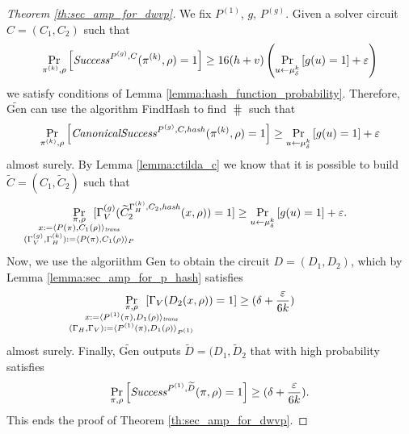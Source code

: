 \begin{proof}[Theorem \ref{th:sec_amp_for_dwvp}]
%
We fix $P^{(1)}$, $g$, $P^{(g)}$. Given a solver circuit $C = (C_1, C_2)$ such that
\begin{align*}
    \underset{\pi^{(k)}, \rho}{\Pr}\left[\operatorname{\mathit{Success}}^{P^{(g)}, C}(\pi^{(k)}, \rho) = 1\right] \geq 16(h+v)\left(\underset{u \leftarrow \mu_\delta^k}{\Pr}\left[g(u) = 1\right] + \varepsilon\right)
\end{align*}
we satisfy conditions of Lemma \ref{lemma:hash_function_probability}. Therefore, $\widetilde{\text{Gen}}$ can use the algorithm FindHash to find $\hash$ such that
\begin{align*}
    \underset{\pi^{(k)}, \rho}{\Pr}\left[\operatorname{\mathit{CanonicalSuccess}}^{P^{(g)}, C, \operatorname{\mathit{hash}}}(\pi^{(k)}, \rho) = 1\right] \geq \underset{u \leftarrow \mu_\delta^k}{\Pr}\left[g(u) = 1\right] + \varepsilon
\end{align*}
almost surely.
By Lemma \ref{lemma:ctilda_c} we know that it is possible to build $\widetilde{C} = (C_1, \widetilde{C}_2)$ such that
\begin{align*}
    \underset{
      \mathclap {
      \substack{\pi, \rho \\
        x := \langle P(\pi), C_1(\rho) \rangle_{\mathit{trans}} \\
        (\Gamma_V^{(g)}, \Gamma_H^{(k)}) := \langle P(\pi), C_1(\rho) \rangle_{P}
      }}}
    {\Pr}\mkern13mu[\Gamma_V^{(g)}(\widetilde{C}_2^{\Gamma_H^{(k)}, C_2, \hash}(x, \rho)) = 1]
    \geq
\underset{u \leftarrow \mu_\delta^k}{\Pr}\left[g(u) = 1\right] + \varepsilon.
\end{align*}
Now, we use the algoriithm Gen to obtain the circuit $D = (D_1, D_2)$, which by Lemma \ref{lemma:sec_amp_for_p_hash} satisfies
\begin{align}
  \label{eq:succ_prob_d}
    \underset{
      \mathclap{
      \substack{\pi, \rho \\ x := \langle P^{(1)}(\pi), D_1(\rho) \rangle_{\mathit{trans}} \\
        (\Gamma_H, \Gamma_V) := \langle P^{(1)}(\pi), D_1(\rho) \rangle_{P^{(1)}}}}}
    {\Pr}\mkern13mu[\Gamma_V(D_2(x, \rho)) = 1] \geq (\delta + \frac{\varepsilon}{6k})
\end{align}
almost surely.
Finally, $\widetilde{\text{Gen}}$ outputs $\widetilde{D} = (D_1, \widetilde{D}_2$ that with high probability satisfies
\begin{align*}
    \underset{\pi, \rho}{\Pr}\left[\operatorname{\mathit{Success}}^{P^{(1)},\widetilde{D}}(\pi, \rho) = 1\right] \geq (\delta + \frac{\varepsilon}{6k}).
\end{align*}
This ends the proof of Theorem \ref{th:sec_amp_for_dwvp}.
\end{proof}

